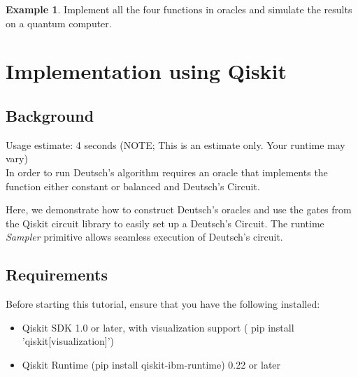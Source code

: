 \documentclass[12pt, oneside]{book}
\theoremstyle{definition}
\theoremstyle{definition}
\newtheorem{example}{Example}[section]
\theoremstyle{remark}
\begin{document}
\begin{example}
    Implement all the four functions in oracles and simulate the results on a quantum computer.
\end{example}
\section{Implementation using Qiskit}
\subsection{Background}
Usage estimate: 4 seconds (NOTE; This is an estimate only. Your runtime may vary)\\
In order to run Deutsch's algorithm requires an oracle that implements the function either constant or balanced and Deutsch's Circuit.

Here, we demonstrate how to construct Deutsch's oracles and use the gates from the Qiskit circuit library to easily set up a Deutsch's Circuit. The runtime \textit{Sampler} primitive allows seamless execution of Deutsch's circuit.

\subsection{Requirements}
Before starting this tutorial, ensure that you have the following installed:
\begin{itemize}
    \item Qiskit SDK 1.0 or later, with visualization support ( pip install 'qiskit[visualization]')
    \item Qiskit Runtime (pip install qiskit-ibm-runtime) 0.22 or later
\end{itemize}
\end{document}
